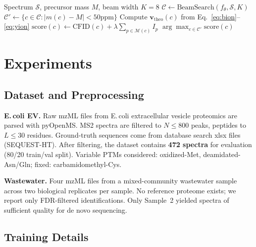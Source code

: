 \documentclass[10pt,twocolumn]{article}
\newcommand{\vect}[1]{\mathbf{#1}}
\begin{document}
\begin{algorithm}[t]
  \caption{V2 Inference: CFID+SGIR Reranking}
  \label{alg:inference}
  \begin{algorithmic}[1]
    \REQUIRE Spectrum $\mathcal{S}$, precursor mass $M$, beam width $K\!=\!8$
    \STATE $\mathcal{C} \leftarrow \text{BeamSearch}(f_\theta, \mathcal{S}, K)$ 
    \STATE $\mathcal{C}' \leftarrow \{c \in \mathcal{C} : |m(c) - M| < 50\text{ppm}\}$ 
      \STATE Compute $\vect{v}_{\text{theo}}(c)$ from Eq.~\ref{eq:bion}--\ref{eq:yion}
      \STATE $\text{score}(c) \leftarrow \text{CFID}(c) + \lambda \sum_{p \in \mathcal{M}(c)} I_p$
    \ENDFOR
    \RETURN $\arg\max_{c \in \mathcal{C}'} \text{score}(c)$
  \end{algorithmic}
\end{algorithm}

\section{Experiments}

\subsection{Dataset and Preprocessing}

\textbf{E.\,coli EV.} Raw mzML files from E.\,coli extracellular vesicle proteomics are
parsed with pyOpenMS.
MS2 spectra are filtered to $N \leq 800$ peaks, peptides to $L \leq 30$ residues.
Ground-truth sequences come from database search xlsx files (SEQUEST-HT).
After filtering, the dataset contains \textbf{472 spectra} for evaluation (80/20 train/val split).
Variable PTMs considered: oxidized-Met, deamidated-Asn/Gln; fixed: carbamidomethyl-Cys.

\textbf{Wastewater.} Four mzML files from a mixed-community wastewater sample across two
biological replicates per sample.
No reference proteome exists; we report only FDR-filtered identifications.
Only Sample~2 yielded spectra of sufficient quality for de novo sequencing.

\subsection{Training Details}
\end{document}
